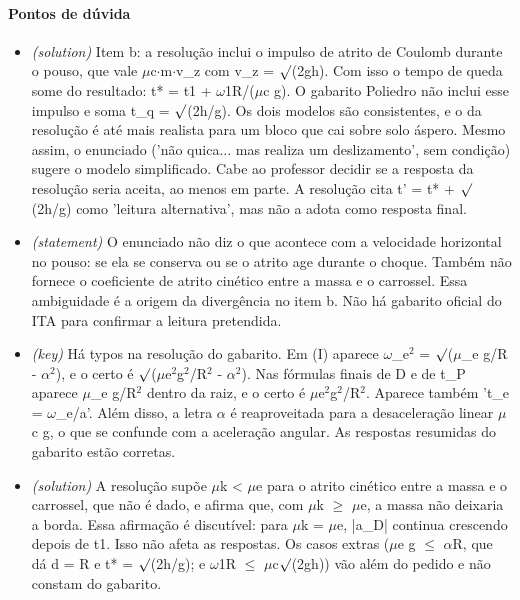 \documentclass{article}%
\begin{document}
\paragraph{Pontos de dúvida}%
\begin{itemize}%
\item%
\textit{(solution)} Item b: a resolução inclui o impulso de atrito de Coulomb durante o pouso, que vale $\mu$c$\cdot$m$\cdot$v\_z com v\_z = $\surd$(2gh). Com isso o tempo de queda some do resultado: t* = t1 + $\omega$1R/($\mu$c g). O gabarito Poliedro não inclui esse impulso e soma t\_q = $\surd$(2h/g). Os dois modelos são consistentes, e o da resolução é até mais realista para um bloco que cai sobre solo áspero. Mesmo assim, o enunciado ('não quica... mas realiza um deslizamento', sem condição) sugere o modelo simplificado. Cabe ao professor decidir se a resposta da resolução seria aceita, ao menos em parte. A resolução cita t' = t* + $\surd$(2h/g) como 'leitura alternativa', mas não a adota como resposta final.%
\item%
\textit{(statement)} O enunciado não diz o que acontece com a velocidade horizontal no pouso: se ela se conserva ou se o atrito age durante o choque. Também não fornece o coeficiente de atrito cinético entre a massa e o carrossel. Essa ambiguidade é a origem da divergência no item b. Não há gabarito oficial do ITA para confirmar a leitura pretendida.%
\item%
\textit{(key)} Há typos na resolução do gabarito. Em (I) aparece $\omega$\_e$^2$ = $\surd$($\mu$\_e g/R - $\alpha$$^2$), e o certo é $\surd$($\mu$e$^2$g$^2$/R$^2$ - $\alpha$$^2$). Nas fórmulas finais de D e de t\_P aparece $\mu$\_e g/R$^2$ dentro da raiz, e o certo é $\mu$e$^2$g$^2$/R$^2$. Aparece também 't\_e = $\omega$\_e/a'. Além disso, a letra $\alpha$ é reaproveitada para a desaceleração linear $\mu$c g, o que se confunde com a aceleração angular. As respostas resumidas do gabarito estão corretas.%
\item%
\textit{(solution)} A resolução supõe $\mu$k < $\mu$e para o atrito cinético entre a massa e o carrossel, que não é dado, e afirma que, com $\mu$k $\geq$ $\mu$e, a massa não deixaria a borda. Essa afirmação é discutível: para $\mu$k = $\mu$e, |a\_D| continua crescendo depois de t1. Isso não afeta as respostas. Os casos extras ($\mu$e g $\leq$ $\alpha$R, que dá d = R e t* = $\surd$(2h/g); e $\omega$1R $\leq$ $\mu$c$\surd$(2gh)) vão além do pedido e não constam do gabarito.%
\end{itemize}%
\end{document}
